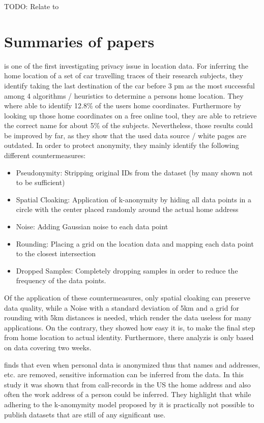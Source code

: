 TODO: Relate to \parencite{k-anonymity}

\section{Summaries of papers}

\parencite{krumm} is one of the first investigating privacy issue in location data. For inferring the home location of a set of car travelling traces of their research subjects, they identify taking the last destination of the car before 3 pm as the most successful among 4 algorithms / heuristics to determine a persons home location. They where able to identify 12.8\% of the users home coordinates. Furthermore by looking up those home coordinates on a free online tool, they are able to retrieve the correct name for about 5\% of the subjects. Nevertheless, those results could be improved by far, as they show that the used data source / white pages are outdated.
In order to protect anonymity, they mainly identify the following different countermeasures:
\begin{itemize}
	\item Pseudonymity: Stripping original IDs from the dataset (by many shown not to be sufficient)
	\item Spatial Cloaking: Application of k-anonymity by hiding all data points in a circle with the center placed randomly around the actual home address
	\item Noise: Adding Gaussian noise to each data point
	\item Rounding: Placing a grid on the location data and mapping each data point to the closest intersection
	\item Dropped Samples: Completely dropping samples in order to reduce the frequency of the data points.
\end{itemize}
Of the application of these countermeasures, only spatial cloaking can preserve data quality, while a Noise with a standard deviation of 5km and a grid for rounding with 5km distances is needed, which render the data useless for many applications.
On the contrary, they showed how easy it is, to make the final step from home location to actual identity. Furthermore, there analyzis is only based on data covering two weeks.


\parencite{cellphone} finds that even when personal data is anonymized thus that names and addresses, etc. are removed, sensitive information can be inferred from the data.
In this study it was shown that from call-records in the US the home address and also often the work address of a person could be inferred.
They highlight that while adhering to the k-anomymity model proposed by \parencite{k-anonymity} it is practically not possible to publish datasets that are still of any significant use.
\\


